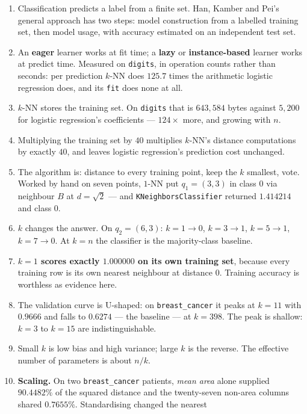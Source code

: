 \documentclass[11pt]{article}
\begin{document}
\begin{enumerate}[leftmargin=*]
  \item Classification predicts a label from a finite set. Han, Kamber and
    Pei's general approach has two steps: model construction from a labelled
    training set, then model usage, with accuracy estimated on an independent
    test set.
  \item An \textbf{eager} learner works at fit time; a \textbf{lazy} or
    \textbf{instance-based} learner works at predict time. Measured on
    \texttt{digits}, in operation counts rather than seconds: per prediction
    $k$-NN does $125.7$ times the arithmetic logistic regression does, and its
    \texttt{fit} does none at all.
  \item $k$-NN stores the training set. On \texttt{digits} that is $643{,}584$
    bytes against $5{,}200$ for logistic regression's coefficients ---
    $124\times$ more, and growing with $n$.
  \item Multiplying the training set by $40$ multiplies $k$-NN's distance
    computations by exactly $40$, and leaves logistic regression's prediction
    cost unchanged.
  \item The algorithm is: distance to every training point, keep the $k$
    smallest, vote. Worked by hand on seven points, $1$-NN put $q_1 = (3,3)$ in
    class $0$ via neighbour $B$ at $d = \sqrt{2}$ --- and
    \texttt{KNeighborsClassifier} returned $1.414214$ and class $0$.
  \item $k$ changes the answer. On $q_2 = (6,3)$: $k=1 \to 0$, $k=3 \to 1$,
    $k=5 \to 1$, $k=7 \to 0$. At $k = n$ the classifier is the majority-class
    baseline.
  \item \textbf{$k=1$ scores exactly $1.000000$ on its own training set},
    because every training row is its own nearest neighbour at distance $0$.
    Training accuracy is worthless as evidence here.
  \item The validation curve is U-shaped: on \texttt{breast\_cancer} it peaks
    at $k=11$ with $0.9666$ and falls to $0.6274$ --- the baseline --- at
    $k=398$. The peak is shallow: $k=3$ to $k=15$ are indistinguishable.
  \item Small $k$ is low bias and high variance; large $k$ is the reverse. The
    effective number of parameters is about $n/k$.
  \item \textbf{Scaling.} On two \texttt{breast\_cancer} patients, \emph{mean
    area} alone supplied $90.4482\%$ of the squared distance and the twenty-seven
    non-area columns shared $0.7655\%$. Standardising changed the nearest

\end{enumerate}
\end{document}
